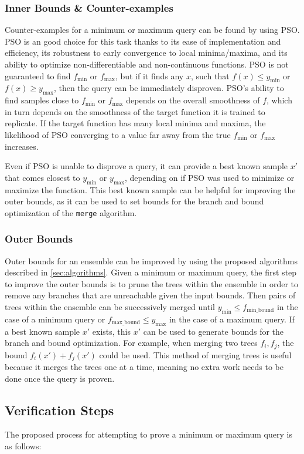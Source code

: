 \documentclass[pageno]{jpaper}
\newcommand{\ymin}{y_{\textrm{min}}}
\newcommand{\ymax}{y_{\textrm{max}}}
\newcommand{\fmin}{f_{\textrm{min}}}
\newcommand{\fmax}{f_{\textrm{max}}}
\newcommand{\fminb}{f_{\textrm{min\_bound}}}
\newcommand{\fmaxb}{f_{\textrm{max\_bound}}}
\begin{document}
\begin{doublespacing}
\subsubsection{Inner Bounds \& Counter-examples}
Counter-examples for a minimum or maximum query can be found by using PSO. PSO is an good choice for this task thanks to its ease of implementation and efficiency, its robustness to early convergence to local minima/maxima, and its ability to optimize non-differentiable and non-continuous functions. PSO is not guaranteed to find $\fmin$ or $\fmax$, but if it finds any $x$, such that $f(x) \le \ymin$ or $f(x) \ge \ymax$, then the query can be immediately disproven. PSO's ability to find samples close to $\fmin$ or $\fmax$ depends on the overall smoothness of $f$, which in turn depends on the smoothness of the target function it is trained to replicate. If the target function has many local minima and maxima, the likelihood of PSO converging to a value far away from the true $\fmin$ or $\fmax$ increases.

Even if PSO is unable to disprove a query, it can provide a best known sample $x'$ that comes closest to $\ymin$ or $\ymax$, depending on if PSO was used to minimize or maximize the function. This best known sample can be helpful for improving the outer bounds, as it can be used to set bounds for the branch and bound optimization of the \verb|merge| algorithm.

\subsubsection{Outer Bounds}
Outer bounds for an ensemble can be improved by using the proposed algorithms described in \autoref{sec:algorithms}. Given a minimum or maximum query, the first step to improve the outer bounds is to prune the trees within the ensemble in order to remove any branches that are unreachable given the input bounds. Then pairs of trees within the ensemble can be successively merged until $\ymin \le \fminb$ in the case of a minimum query or $\fmaxb \le \ymax$ in the case of a maximum query. If a best known sample $x'$ exists, this $x'$ can be used to generate bounds for the branch and bound optimization. For example, when merging two trees $f_i, f_j$, the bound $f_i (x') + f_j (x')$ could be used. This method of merging trees is useful because it merges the trees one at a time, meaning no extra work needs to be done once the query is proven.

\subsection{Verification Steps}
The proposed process for attempting to prove a minimum or maximum query is as follows:


\end{doublespacing}
\end{document}

